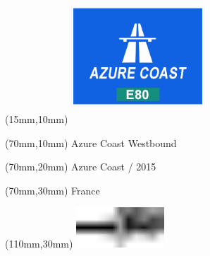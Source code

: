 \null\newpage
\begin{textblock*}{50mm}(15mm,10mm)%
\includegraphics[width=50mm]{LG/AZO.png}
\end{textblock*}
\begin{textblock*}{130mm}(70mm,10mm)%
{\fontsize{20}{20}\selectfont Azure Coast Westbound}\\
\end{textblock*}
\begin{textblock*}{120mm}(70mm,20mm)%
{\fontsize{16}{16}\selectfont Azure Coast / 2015}\\
\end{textblock*}
\begin{textblock*}{120mm}(70mm,30mm)%
{\fontsize{12}{12}\selectfont France}
\end{textblock*}
\begin{textblock*}{30mm}(110mm,30mm)%
\centering
\includegraphics[height=15mm]{icons/tofinish.pdf}
\end{textblock*}
